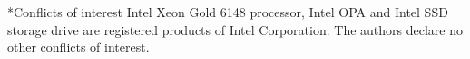 \documentclass[runningheads]{llncs}
\begin{document}
	
	\begin{section}*{Conflicts of interest}
	Intel\textregistered{} Xeon\textregistered{} Gold 6148 processor, Intel\textregistered{} OPA and Intel\textregistered{} SSD storage drive are registered products of Intel Corporation. The authors declare no other conflicts of interest.
		
	\end{section}
	
	
\end{document}
